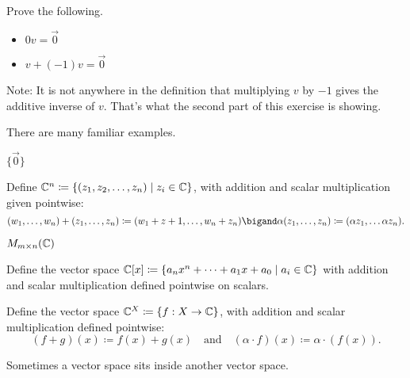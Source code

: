 \begin{exercise}
    Prove the following.
    \begin{itemize}
        \item $0 v=\vec{0}$
        \item $v + (-1)v = \vec{0}$
    \end{itemize}
    Note: It is not anywhere in the definition that multiplying $v$ by $-1$ gives the additive inverse of $v$.
    That's what the second part of this exercise is showing.
\end{exercise}

There are many familiar examples.

\begin{example}[Zero]
    $\{ \vec{0} \}$
\end{example}


\begin{example}[$\C$]
    
\end{example}


\begin{example}[Tuples]
    Define $\mathbb{C}^n \coloneq \{ (z_1,z_2,\dots,z_n) \mid z_i \in \mathbb{C} \}$, with addition and scalar multiplication 
    given pointwise:
    \[
        (w_1,\dots,w_n)+(z_1,\dots,z_n) \coloneq (w_1+z+1,\dots,w_n+z_n) \bigand 
        \alpha(z_1,\dots,z_n) \coloneq (\alpha z_1,\dots \alpha z_n).
    \]
\end{example}


\begin{example}[Matrices]
    $M_{m\times n}(\mathbb{C})$
\end{example}


\begin{example}[Polynomials]
    Define the vector space $\mathbb{C}[x] \coloneq \{ a_n x^n +\cdots+ a_1 x + a_0 \mid a_i \in \mathbb{C} \}$ with addition 
    and scalar multiplication defined pointwise on scalars.
\end{example}


\begin{example}[Functions]
    Define the vector space $\mathbb{C}^{X} \coloneq \{ f:X \to \mathbb{C}\}$, with addition and scalar multiplication defined pointwise:
    \[
        (f+g)(x) \coloneq f(x) + g(x) \quad \text{and} \quad (\alpha \cdot f)(x) \coloneq \alpha \cdot (f(x)).
    \]
\end{example}




Sometimes a vector space sits inside another vector space.

